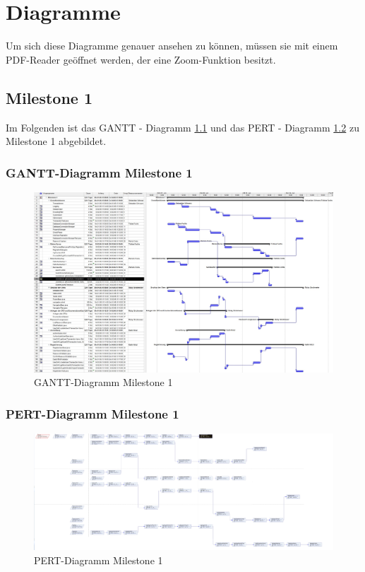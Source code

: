 \chapter{Diagramme}
Um sich diese Diagramme genauer ansehen zu können, müssen sie mit einem PDF-Reader
geöffnet werden, der eine Zoom-Funktion besitzt.
\section{Milestone 1}
Im Folgenden ist das GANTT - Diagramm \ref{fig:GANTT-Diagramm Milestone 1} und das PERT - Diagramm \ref{fig:PERT-Diagramm Milestone 1} zu Milestone 1 abgebildet.
\newpage
\subsection{GANTT-Diagramm Milestone 1}
 \begin{figure}[h]
 		\centering
 		\includegraphics[width=1\linewidth, angle=90]{Grafiken/Milestone1Gantt}
 		\caption{GANTT-Diagramm Milestone 1}
 		\label{fig:GANTT-Diagramm Milestone 1}
 \end{figure}


\clearpage
\subsection{PERT-Diagramm Milestone 1}
\begin{figure}[h]
	\centering
	\includegraphics[width=1.0\linewidth, angle=90]{Grafiken/Milestone1Pert}
	\caption{PERT-Diagramm Milestone 1}
	\label{fig:PERT-Diagramm Milestone 1}
\end{figure}
\clearpage
